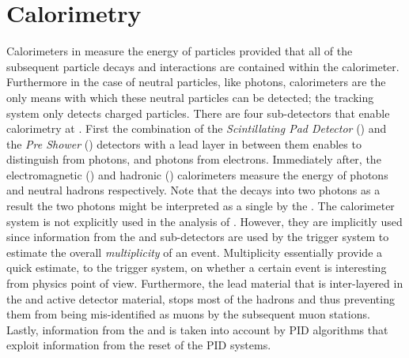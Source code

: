

\section{Calorimetry}
\label{det_calo}
Calorimeters in \lhcb measure the energy of particles provided that all of the subsequent particle decays
and interactions are contained within the calorimeter. Furthermore in the case of neutral particles, like photons,
calorimeters are the only means with which these neutral particles can be detected; the tracking system
only detects charged particles. There are four sub-detectors that enable calorimetry at \lhcb.
First the combination of the {\it Scintillating Pad Detector} (\spd)
and the {\it Pre Shower} (\presh) detectors with a lead layer in between them enables to distinguish \piz from
photons, and photons from electrons. Immediately after, the electromagnetic (\ecal) and hadronic (\hcal)
calorimeters measure the energy of photons and neutral hadrons respectively.
Note that the \piz decays into two photons as a result the two photons might be interpreted as a single by the \ecal.
The calorimeter system is not explicitly used in the analysis of .
However, they are implicitly used since information from the \spd and \presh sub-detectors are used
by the \lzero trigger system to estimate the overall {\it multiplicity} of an event. Multiplicity essentially
provide a quick estimate, to the \lzero trigger system, on whether a certain event is interesting from physics
point of view. Furthermore, the lead material that is inter-layered in the \ecal and \hcal active detector material,
stops most of the hadrons and thus preventing them from being mis-identified as muons by the subsequent muon stations.
Lastly, information from the \ecal and \hcal is taken into account by PID algorithms that exploit information from
the reset of the PID systems.

